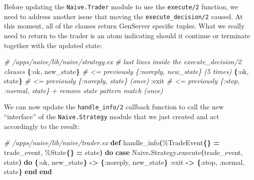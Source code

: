 \documentclass[
  oneside]{book}
\newenvironment{Shaded}{\begin{snugshade}}{\end{snugshade}}
\newcommand{\CommentTok}[1]{\textcolor[rgb]{0.56,0.35,0.01}{\textit{#1}}}
\newcommand{\ConstantTok}[1]{\textcolor[rgb]{0.56,0.35,0.01}{#1}}
\newcommand{\FunctionTok}[1]{\textcolor[rgb]{0.13,0.29,0.53}{\textbf{#1}}}
\newcommand{\KeywordTok}[1]{\textcolor[rgb]{0.13,0.29,0.53}{\textbf{#1}}}
\newcommand{\NormalTok}[1]{#1}
\newcommand{\OperatorTok}[1]{\textcolor[rgb]{0.81,0.36,0.00}{\textbf{#1}}}
\newcommand{\VariableTok}[1]{\textcolor[rgb]{0.00,0.00,0.00}{#1}}
\begin{document}
Before updating the \texttt{Naive.Trader} module to use the \texttt{execute/2} function, we need to address another issue that moving the \texttt{execute\_decision/2} caused. At this moment, all of the clauses return GenServer specific tuples. What we really need to return to the trader is an atom indicating should it continue or terminate together with the updated state:

\begin{Shaded}
\begin{Highlighting}[]
\CommentTok{\# /apps/naive/lib/naive/strategy.ex}
\CommentTok{\# last lines inside the \textasciigrave{}execute\_decision/2\textasciigrave{} clauses}
\FunctionTok{\{}\VariableTok{:ok}\NormalTok{, new\_state}\FunctionTok{\}} \CommentTok{\# \textless{}= previously \{:noreply, new\_state\} (5 times)}
\FunctionTok{\{}\VariableTok{:ok}\NormalTok{, state}\FunctionTok{\}} \CommentTok{\# \textless{}= previously \{:noreply, state\} (once)}
\VariableTok{:exit} \CommentTok{\# \textless{}= previously \{:stop, :normal, state\} + remove \textasciigrave{}state\textasciigrave{} pattern match (once)}
\end{Highlighting}
\end{Shaded}

We can now update the \texttt{handle\_info/2} callback function to call the new ``interface'' of the \texttt{Naive.Strategy} module that we just created and act accordingly to the result:

\begin{Shaded}
\begin{Highlighting}[]
\CommentTok{\# /apps/naive/lib/naive/trader.ex}
  \KeywordTok{def}\NormalTok{ handle\_info}\FunctionTok{(}\NormalTok{\%}\ConstantTok{TradeEvent}\FunctionTok{\{\}} \OperatorTok{=}\NormalTok{ trade\_event, \%}\ConstantTok{State}\FunctionTok{\{\}} \OperatorTok{=}\NormalTok{ state}\FunctionTok{)} \KeywordTok{do}
    \KeywordTok{case} \ConstantTok{Naive}\OperatorTok{.}\ConstantTok{Strategy}\OperatorTok{.}\NormalTok{execute}\FunctionTok{(}\NormalTok{trade\_event, state}\FunctionTok{)} \KeywordTok{do}
      \FunctionTok{\{}\VariableTok{:ok}\NormalTok{, new\_state}\FunctionTok{\}} \OperatorTok{{-}\textgreater{}} \FunctionTok{\{}\VariableTok{:noreply}\NormalTok{, new\_state}\FunctionTok{\}}
      \VariableTok{:exit} \OperatorTok{{-}\textgreater{}} \FunctionTok{\{}\VariableTok{:stop}\NormalTok{, }\VariableTok{:normal}\NormalTok{, state}\FunctionTok{\}}
    \KeywordTok{end}
  \KeywordTok{end}
\end{Highlighting}
\end{Shaded}
\end{document}
